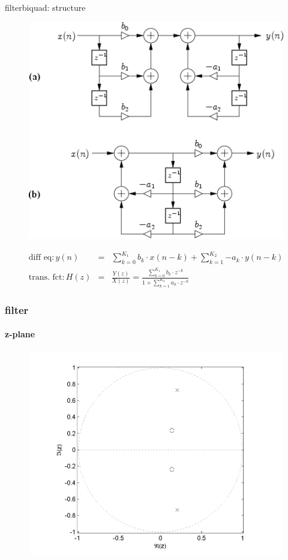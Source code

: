 	\begin{frame}{filter}{biquad: structure}
		\begin{figure}
			\centerline{\includegraphics[scale=.3]{graph/general_biquad_jos}}
		    \label{fig:general_biquad}
		\end{figure}
		\pause
		\vspace{-3mm}
		\begin{eqnarray}
			\text{diff eq}: y(n) 	&=& \sum_{k=0}^{K_1}{b_k\cdot x(n-k)} + \sum_{k=1}^{K_2}{-a_k\cdot y(n-k)} \nonumber\\
			\text{trans. fct}: H(z) 	&=& \frac{Y(z)}{X(z)} =  \frac{\sum_{k=0}^{K_1}{b_k\cdot z^{-k}}}{1 + \sum_{k=1}^{K_2}{a_k\cdot z^{-k}}} 
		\end{eqnarray}
	\end{frame}
	
	\begin{frame}\frametitle{filter}\framesubtitle{z-plane}
			\begin{figure}[!hbt]
				\begin{center}
					\includegraphics[scale=.6]{graph/PoleZero}
				\end{center}
			\end{figure}
	\end{frame}
	

